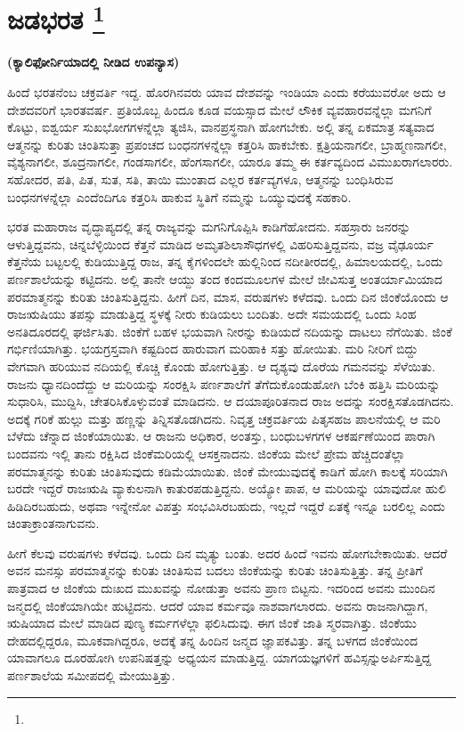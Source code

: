 
\chapter[ಜಡಭರತ]{ಜಡಭರತ \protect\footnote{}}

\centerline{\textbf{(ಕ್ಯಾಲಿಫೋರ್ನಿಯಾದಲ್ಲಿ ನೀಡಿದ ಉಪನ್ಯಾಸ)}}

ಹಿಂದೆ ಭರತನೆಂಬ ಚಕ್ರವರ್ತಿ ಇದ್ದ. ಹೊರಗಿನವರು ಯಾವ ದೇಶವನ್ನು ಇಂಡಿಯಾ ಎಂದು ಕರೆಯುವರೋ ಅದು ಆ ದೇಶದವರಿಗೆ ಭಾರತವರ್ಷ. ಪ್ರತಿಯೊಬ್ಬ ಹಿಂದೂ ಕೂಡ ವಯಸ್ಸಾದ ಮೇಲೆ ಲೌಕಿಕ ವ್ಯವಹಾರವನ್ನೆಲ್ಲಾ ಮಗನಿಗೆ ಕೊಟ್ಟು, ಐಶ್ವರ್ಯ ಸುಖಭೋಗಗಳನ್ನೆಲ್ಲಾ ತ್ಯಜಿಸಿ, ವಾನಪ್ರಸ್ಥನಾಗಿ ಹೋಗಬೇಕು. ಅಲ್ಲಿ ತನ್ನ ಏಕಮಾತ್ರ ಸತ್ಯವಾದ ಆತ್ಮನನ್ನು ಕುರಿತು ಚಿಂತಿಸುತ್ತಾ ಪ್ರಪಂಚದ ಬಂಧನಗಳನ್ನೆಲ್ಲಾ ಕತ್ತರಿಸಿ ಹಾಕಬೇಕು. ಕ್ಷತ್ರಿಯ\-ನಾಗಲೀ, ಬ್ರಾಹ್ಮಣನಾಗಲೀ, ವೈಶ್ಯನಾಗಲೀ, ಶೂದ್ರನಾಗಲೀ, ಗಂಡಸಾಗಲೀ, ಹೆಂಗಸಾಗಲೀ, ಯಾರೂ ತಮ್ಮ ಈ ಕರ್ತವ್ಯದಿಂದ ವಿಮುಖರಾಗಲಾರರು. ಸಹೋದರ, ಪತಿ, ಪಿತ, ಸುತ, ಸತಿ, ತಾಯಿ ಮುಂತಾದ ಎಲ್ಲರ ಕರ್ತವ್ಯಗಳೂ, ಆತ್ಮನನ್ನು ಬಂಧಿಸಿರುವ ಬಂಧನಗಳನ್ನೆಲ್ಲಾ ಎಂದೆಂದಿಗೂ ಕತ್ತರಿಸಿ ಹಾಕುವ ಸ್ಥಿತಿಗೆ ನಮ್ಮನ್ನು ಒಯ್ಯುವುದಕ್ಕೆ ಸಹಕಾರಿ.

ಭರತ ಮಹಾರಾಜ ವೃದ್ಧಾಪ್ಯದಲ್ಲಿ ತನ್ನ ರಾಜ್ಯವನ್ನು ಮಗನಿಗೊಪ್ಪಿಸಿ ಕಾಡಿಗೆ\break ಹೋದನು. ಸಹಸ್ರಾರು ಜನರನ್ನು ಆಳುತ್ತಿದ್ದವನು, ಚಿನ್ನಬೆಳ್ಳಿಯಿಂದ ಕೆತ್ತನೆ ಮಾಡಿದ ಅಮೃತಶಿಲಾಸೌಧಗಳಲ್ಲಿ ವಿಹರಿಸುತ್ತಿದ್ದವನು, ವಜ್ರ ವೈಢೂರ್ಯ ಕೆತ್ತನೆಯ ಬಟ್ಟಲಲ್ಲಿ ಕುಡಿಯುತ್ತಿದ್ದ ರಾಜ, ತನ್ನ ಕೈಗಳಿಂದಲೇ ಹುಲ್ಲಿನಿಂದ ನದೀತೀರದಲ್ಲಿ, ಹಿಮಾಲಯದಲ್ಲಿ, ಒಂದು ಪರ್ಣಶಾಲೆಯನ್ನು ಕಟ್ಟಿದನು. ಅಲ್ಲಿ ತಾನೇ ಆಯ್ದು ತಂದ ಕಂದಮೂಲಗಳ ಮೇಲೆ ಜೀವಿಸುತ್ತ ಅಂತರ್ಯಾಮಿಯಾದ ಪರಮಾತ್ಮನನ್ನು ಕುರಿತು ಚಿಂತಿಸುತ್ತಿದ್ದನು. ಹೀಗೆ ದಿನ, ಮಾಸ, ವರುಷಗಳು ಕಳೆದವು. ಒಂದು ದಿನ ಜಿಂಕೆಯೊಂದು ಆ ರಾಜಋಷಿಯು ತಪಸ್ಸು ಮಾಡುತ್ತಿದ್ದ ಸ್ಥಳಕ್ಕೆ ನೀರು ಕುಡಿಯಲು ಬಂದಿತು. ಅದೇ ಸಮಯದಲ್ಲಿ ಒಂದು ಸಿಂಹ ಅನತಿದೂರದಲ್ಲಿ ಘರ್ಜಿಸಿತು. ಜಿಂಕೆಗೆ ಬಹಳ ಭಯವಾಗಿ ನೀರನ್ನು ಕುಡಿಯದೆ ನದಿಯನ್ನು ದಾಟಲು ನೆಗೆಯಿತು. ಜಿಂಕೆ ಗರ್ಭಿಣಿಯಾಗಿತ್ತು. ಭಯಗ್ರಸ್ತವಾಗಿ ಕಷ್ಟದಿಂದ ಹಾರುವಾಗ ಮರಿಹಾಕಿ ಸತ್ತು ಹೋಯಿತು. ಮರಿ ನೀರಿಗೆ ಬಿದ್ದು ವೇಗವಾಗಿ ಹರಿಯುವ ನದಿಯಲ್ಲಿ ಕೊಚ್ಚಿ ಕೊಂಡು ಹೋಗುತ್ತಿತ್ತು. ಆ ದೃಶ್ಯವು ದೊರೆಯ ಗಮನವನ್ನು ಸೆಳೆಯಿತು. ರಾಜನು ಧ್ಯಾನದಿಂದೆದ್ದು ಆ ಮರಿಯನ್ನು ಸಂರಕ್ಷಿಸಿ ಪರ್ಣಶಾಲೆಗೆ ತೆಗೆದುಕೊಂಡುಹೋಗಿ ಬೆಂಕಿ ಹತ್ತಿಸಿ ಮರಿಯನ್ನು ಸುಧಾರಿಸಿ, ಮುದ್ದಿಸಿ, ಚೇತರಿಸಿಕೊಳ್ಳುವಂತೆ ಮಾಡಿದನು. ಆ ದಯಾ\-ಪೂರಿತನಾದ ರಾಜ ಅದನ್ನು ಸಂರಕ್ಷಿಸತೊಡಗಿದನು. ಅದಕ್ಕೆ ಗರಿಕೆ ಹುಲ್ಲು ಮತ್ತು ಹಣ್ಣನ್ನು ತಿನ್ನಿಸತೊಡಗಿದನು. ನಿವೃತ್ತ ಚಕ್ರವರ್ತಿಯ ಪಿತೃಸಹಜ ಪಾಲನೆಯಲ್ಲಿ ಆ ಮರಿ ಬೆಳೆದು ಚೆನ್ನಾದ ಜಿಂಕೆಯಾಯಿತು. ಆ ರಾಜನು ಅಧಿಕಾರ, ಅಂತಸ್ತು, ಬಂಧುಬಳಗಗಳ ಆಕರ್ಷಣೆಯಿಂದ ಪಾರಾಗಿ ಬಂದವನು ಇಲ್ಲಿ ತಾನು ರಕ್ಷಿಸಿದ ಜಿಂಕೆಮರಿಯಲ್ಲಿ ಆಸಕ್ತನಾದನು. ಜಿಂಕೆಯ ಮೇಲೆ ಪ್ರೇಮ ಹೆಚ್ಚಿದಂತೆಲ್ಲಾ ಪರಮಾತ್ಮನನ್ನು ಕುರಿತು ಚಿಂತಿಸುವುದು ಕಡಿಮೆಯಾಯಿತು. ಜಿಂಕೆ ಮೇಯುವುದಕ್ಕೆ ಕಾಡಿಗೆ ಹೋಗಿ ಕಾಲಕ್ಕೆ ಸರಿಯಾಗಿ ಬರದೇ ಇದ್ದರೆ ರಾಜಋಷಿ ವ್ಯಾಕುಲನಾಗಿ ಕಾತುರಪಡುತ್ತಿದ್ದನು. ಅಯ್ಯೋ ಪಾಪ, ಆ ಮರಿಯನ್ನು ಯಾವುದೋ ಹುಲಿ ಹಿಡಿದಿರಬಹುದು, ಅಥವಾ ಇನ್ನೇನೋ ವಿಪತ್ತು ಸಂಭವಿಸಿರಬಹುದು, ಇಲ್ಲದೆ ಇದ್ದರೆ ಏತಕ್ಕೆ ಇನ್ನೂ ಬರಲಿಲ್ಲ ಎಂದು ಚಿಂತಾಕ್ರಾಂತನಾಗುವನು.

ಹೀಗೆ ಕೆಲವು ವರುಷಗಳು ಕಳೆದವು. ಒಂದು ದಿನ ಮೃತ್ಯು ಬಂತು. ಅದರ ಹಿಂದೆ ಇವನು ಹೋಗಬೇಕಾಯಿತು. ಆದರೆ ಅವನ ಮನಸ್ಸು ಪರಮಾತ್ಮನನ್ನು ಕುರಿತು ಚಿಂತಿಸುವ ಬದಲು ಜಿಂಕೆಯನ್ನು ಕುರಿತು ಚಿಂತಿಸುತ್ತಿತ್ತು. ತನ್ನ ಪ್ರೀತಿಗೆ ಪಾತ್ರವಾದ ಆ ಜಿಂಕೆಯ ದುಃಖದ ಮುಖವನ್ನು ನೋಡುತ್ತಾ ಅವನು ಪ್ರಾಣ ಬಿಟ್ಟನು. ಇದರಿಂದ ಅವನು ಮುಂದಿನ ಜನ್ಮದಲ್ಲಿ ಜಿಂಕೆಯಾಗಿಯೇ ಹುಟ್ಟಿದನು. ಆದರೆ ಯಾವ ಕರ್ಮವೂ ನಾಶವಾಗಲಾರದು. ಅವನು ರಾಜನಾಗಿದ್ದಾಗ, ಋಷಿಯಾದ ಮೇಲೆ ಮಾಡಿದ ಪುಣ್ಯ ಕರ್ಮಗಳೆಲ್ಲಾ ಫಲಿಸಿದುವು. ಈಗ ಜಿಂಕೆ ಜಾತಿ ಸ್ಮರವಾಗಿತ್ತು. ಜಿಂಕೆಯು ದೇಹದಲ್ಲಿದ್ದರೂ, ಮೂಕವಾಗಿದ್ದರೂ, ಅದಕ್ಕೆ ತನ್ನ ಹಿಂದಿನ ಜನ್ಮದ ಜ್ಞಾಪಕವಿತ್ತು. ತನ್ನ ಬಳಗದ ಜಿಂಕೆಯಿಂದ ಯಾವಾಗಲೂ ದೂರಹೋಗಿ ಉಪನಿಷತ್ತನ್ನು ಅಧ್ಯಯನ ಮಾಡುತ್ತಿದ್ದ. ಯಾಗಯಜ್ಞಗಳಿಗೆ ಹವಿಸ್ಸನ್ನು\break ಅರ್ಪಿಸುತ್ತಿದ್ದ ಪರ್ಣಶಾಲೆಯ ಸಮೀಪದಲ್ಲಿ ಮೇಯುತ್ತಿತ್ತು.


